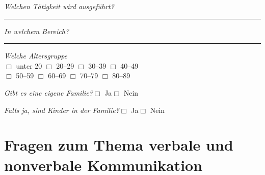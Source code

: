 \documentclass[a4paper,12pt]{scrartcl}
\newcommand{\checkbox}{\(\Box\)}
\newcommand{\hfilloutline}[1]{\rule{#1}{0.5pt}}
\newcommand{\frage}[1]{\textit{#1}}
\begin{document}
\frage{Welchen Tätigkeit wird ausgeführt?}
\hfill\hfilloutline{9cm}


\frage{In welchem Bereich?}
\hfill\hfilloutline{9cm}


\frage{Welche Altersgruppe}\\
\checkbox{} unter 20 \hfill
\checkbox{} 20--29 \hfill
\checkbox{} 30--39 \hfill
\checkbox{} 40--49 \\
\checkbox{} 50--59 \hfill
\checkbox{} 60--69 \hfill
\checkbox{} 70--79 \hfill
\checkbox{} 80--89

\frage{Gibt es eine eigene Familie?}\hfill \checkbox{} Ja\hspace{0.8cm}\checkbox{} Nein\par
\frage{Falls ja, sind Kinder in der Familie?}\hfill \checkbox{} Ja\hspace{0.8cm}\checkbox{} Nein
\newpage






\section*{Fragen zum Thema verbale und nonverbale Kommunikation}
\end{document}

